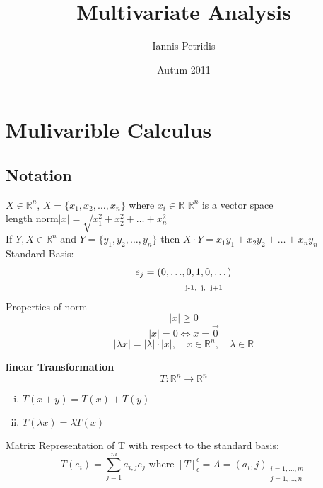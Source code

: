 \documentclass[12pt]{article}
\def\RR{\mathbb{R}}
\begin{document}
\title{Multivariate Analysis}
\author{Iannis Petridis}
\date{Autum 2011}
\maketitle

\tableofcontents
\setcounter{tocdepth}{4}
\newpage

\section{Mulivarible  Calculus}
\subsection{Notation}
$X\in\RR^{n}$, $ X=\{x_{1},x_{2},\dots,x_{n}\}$ where $x_{i}\in\RR$
$\RR^{n}$ is a vector space\\
length norm$|x|=\sqrt{x_1^2 + x_2^2 + \dots +x_n^2 }$\\
If $Y,X\in\RR^{n}$ and $ Y=\{y_{1},y_{2},\dots,y_{n}\}$ then $X \cdot Y=x_{1}y_{1}+ x_{2}y_{2} +\dots + x_{n}y_{n}$\\
Standard Basis:
\begin{align*}
  e_j=(0, \dots &,  0, 1, 0, \dots)\\
& \textrm{ \scriptsize j-1,\: j, \:j+1} 
\end{align*}
Properties of norm
\[|x|\geq0\]
\[|x|=0  \iff x=\vec{0}\]
\[| \lambda x| = | \lambda| \cdot |x| , \quad x \in \RR^n, \quad \lambda \in \RR \]

\textbf{linear Transformation}
\[T:\RR^{n}\rightarrow\RR^{n}\]
\begin{enumerate}[(i)]
\item $ T(x+y)=T(x) + T(y)$
\item $T(\lambda x) =\lambda T(x) $
\end{enumerate}
Matrix Representation of T with respect to the standard basis:\\
\[T(e_i)=\sum_{j=1}^{m}a_{i,j}e_j \textrm{ where } [T]_{\epsilon}^{\epsilon}=A=(a_i,j)_{\substack{i=1,\dots ,m \\ j=1,\dots ,n}}\]
\end{document}

